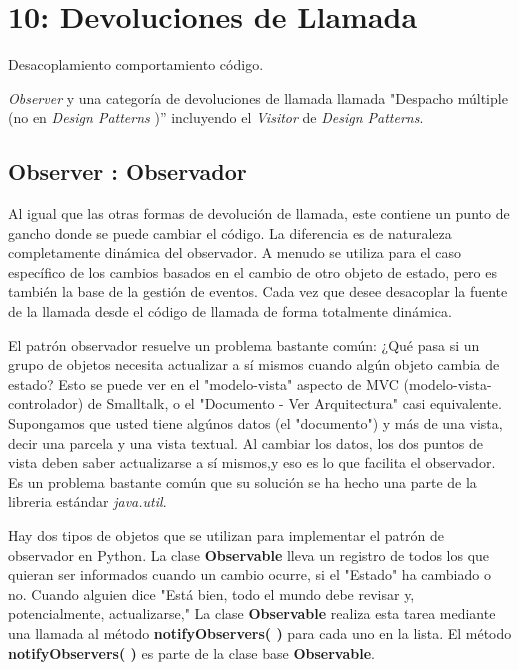 
\section*{10: Devoluciones de Llamada}
\label{sec:ddl}

Desacoplamiento comportamiento código.  \newline

\textit{Observer} y una categoría de devoluciones de llamada llamada "Despacho múltiple (no en \textit{Design Patterns} )” incluyendo el \textit{Visitor} de \textit{Design Patterns}.   \newline

\subsection*{Observer : Observador}
\label{subsec:Observer}

Al igual que las otras formas de devolución de llamada, este contiene un punto de gancho donde se puede cambiar el código. La diferencia es de naturaleza completamente dinámica del observador. A menudo se utiliza para el caso específico de los cambios basados en el cambio de otro objeto de estado, pero es también la base de la gestión de eventos. Cada vez que desee desacoplar la fuente de la llamada desde el código de llamada de forma totalmente dinámica.     \newline

El patrón observador resuelve un problema bastante común: ¿Qué pasa si un grupo de objetos necesita actualizar a sí mismos cuando algún objeto cambia de estado? Esto se puede ver en el "modelo-vista" aspecto de MVC (modelo-vista-controlador) de Smalltalk, o el "Documento - Ver Arquitectura" casi equivalente. Supongamos que usted tiene algúnos datos (el "documento") y más de una vista, decir una parcela y una vista textual. Al cambiar los datos, los dos puntos de vista deben saber actualizarse a sí mismos,y eso es lo que facilita el observador. Es un problema bastante común que su solución se ha hecho una parte de la libreria  estándar \textit{java.util}. \newline

Hay dos tipos de objetos que se utilizan para implementar el patrón de observador en Python. La clase \textbf{Observable} lleva un registro de todos los que quieran ser informados cuando un cambio ocurre, si el "Estado" ha cambiado o no. Cuando alguien dice "Está bien, todo el mundo debe revisar y, potencialmente, actualizarse," La clase \textbf{Observable} realiza esta tarea mediante una llamada al método \textbf{notifyObservers( )} para cada uno en la lista. El método \textbf{notifyObservers( )} es parte de la clase base \textbf{Observable}.   \newline

